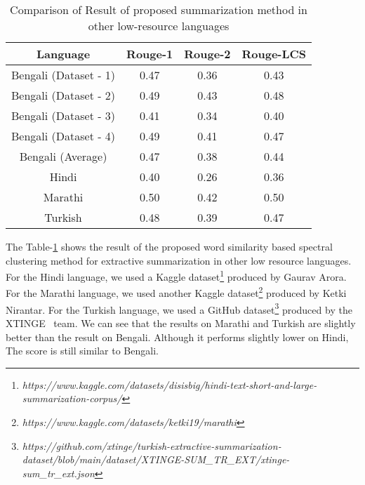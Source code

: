 \begin{table}[H]
    \centering
    \begin{tabular}{cccc}\hline
        Language                & Rouge-1   & Rouge-2   & Rouge-LCS \\\hline
        Bengali (Dataset - 1)   & 0.47      & 0.36      & 0.43      \\
        Bengali (Dataset - 2)   & 0.49      & 0.43      & 0.48      \\
        Bengali (Dataset - 3)   & 0.41      & 0.34      & 0.40      \\
        Bengali (Dataset - 4)   & 0.49      & 0.41      & 0.47      \\
        Bengali (Average)       & 0.47      & 0.38      & 0.44      \\\hline
        Hindi                   & 0.40      & 0.26      & 0.36      \\\hline
        Marathi                 & 0.50	    & 0.42      & 0.50      \\\hline
        Turkish                 & 0.48      & 0.39      & 0.47      \\\hline
    \end{tabular}
    \caption{Comparison of Result of proposed summarization method in other low-resource languages}
    \label{tab:other_language}
\end{table}

The Table-\ref{tab:other_language} shows the result of the proposed word similarity based spectral clustering
method for extractive summarization in other low resource languages.
For the Hindi language, we used a Kaggle
dataset\footnote{\textit{https://www.kaggle.com/datasets/disisbig/hindi-text-short-and-large-summarization-corpus/}}
produced by Gaurav Arora.
For the Marathi language, we used another Kaggle
dataset\footnote{\textit{https://www.kaggle.com/datasets/ketki19/marathi}} produced by Ketki Nirantar.
For the Turkish language, we used a GitHub
dataset\footnote{\textit{https://github.com/xtinge/turkish-extractive-summarization-dataset/blob/main/dataset/XTINGE-SUM\_TR\_EXT/xtinge-sum\_tr\_ext.json}}
produced by the XTINGE~\cite{Demir-2024-xtinge_turkish_extractive} team.
We can see that the results on Marathi and Turkish are slightly better than the result on Bengali.
Although it performs slightly lower on Hindi, The score is still similar to Bengali.



